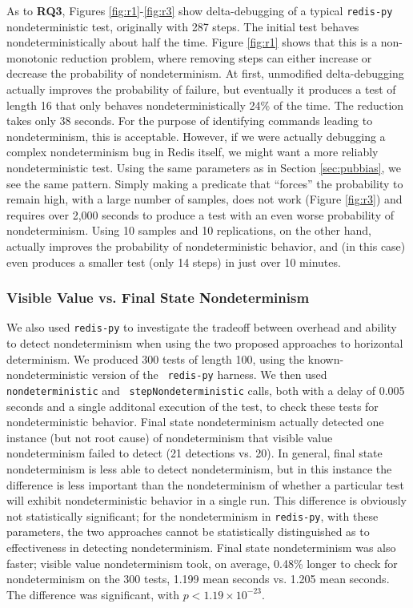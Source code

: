 {As to {\bf RQ3}, Figures \ref{fig:r1}-\ref{fig:r3} show delta-debugging of a typical
{\tt redis-py} nondeterministic test, originally with 287 steps.  The initial test behaves
nondeterministically about half the time.  Figure \ref{fig:r1} shows
that this is a non-monotonic reduction problem, where removing steps
can either increase or decrease the probability of nondeterminism.  At
first, unmodified delta-debugging actually improves the probability of
failure, but eventually it produces a test of length 16 that only behaves
nondeterministically 24\% of the time.  The reduction takes only 38
seconds.  For the purpose of identifying commands leading to
nondeterminism, this is acceptable.  However, if we were actually
debugging a complex nondeterminism bug in Redis itself, we might want
a more reliably nondeterministic test.  Using the same parameters as
in Section \ref{sec:pubbias}, we see the same pattern.  Simply making
a predicate that ``forces'' the probability to remain high, with a
large number of samples, does not work (Figure \ref{fig:r3}) and
requires over 2,000 seconds to produce a test with an even worse
probability of nondeterminism.  Using 10 samples and 10 replications,
on the other hand, actually improves the probability of
nondeterministic behavior, and (in this case) even produces a smaller test (only 14 steps) in just
over 10 minutes.

\subsubsection{Visible Value vs. Final State Nondeterminism}

We also used {\tt redis-py} to investigate the tradeoff between
overhead and ability to detect nondeterminism when using the two
proposed approaches to horizontal determinism.  We produced 300 tests
of length 100, using the known-nondeterministic version of the {\tt
  redis-py} harness.  We then used {\tt nondeterministic} and {\tt
  stepNondeterministic} calls, both with a delay of 0.005 seconds and
a single additonal execution of the test, to
check these tests for nondeterministic behavior.  Final state
nondeterminism actually detected one instance (but not root cause) of nondeterminism that
visible value nondeterminism failed to detect (21 detections
vs. 20). In general, final state
nondeterminism is less able to detect nondeterminism, but in this
instance the difference is less important than the nondeterminism of
whether a particular test will exhibit nondeterministic behavior in a
single run.  This difference is obviously not statistically
significant; for the nondeterminism in {\tt redis-py}, with these
parameters, the two approaches cannot be statistically distinguished
as to effectiveness in detecting nondeterminism.
Final state nondeterminism was also faster; visible value
nondeterminism took, on average, 0.48\% longer to check for
nondeterminism on the 300 tests, 1.199 mean seconds vs. 1.205 mean seconds.  The difference was significant, with
$p < 1.19 \times 10^{-23}$.

}
